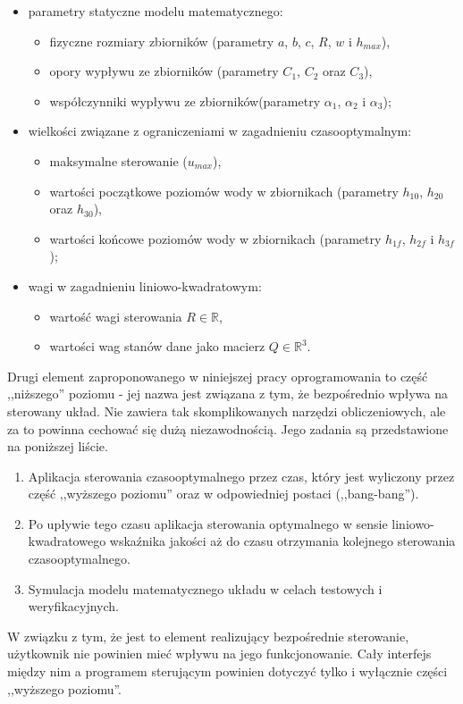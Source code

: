 \begin{itemize}
    \item parametry statyczne modelu matematycznego:
    \begin{itemize}
        \item fizyczne rozmiary zbiorników (parametry $a$, $b$, $c$, $R$, $w$ i $h_{max}$),
        \item opory wypływu ze zbiorników (parametry $C_{1}$, $C_{2}$ oraz $C_{3}$),
        \item współczynniki wypływu ze zbiorników(parametry $\alpha_{1}$, $\alpha_{2}$ i $\alpha_{3}$);
    \end{itemize}
    \item wielkości związane z ograniczeniami w zagadnieniu czasooptymalnym:
    \begin{itemize}
        \item maksymalne sterowanie ($u_{max}$),
        \item wartości początkowe poziomów wody w zbiornikach (parametry $h_{10}$, $h_{20}$ oraz $h_{30}$),
        \item wartości końcowe poziomów wody w zbiornikach (parametry $h_{1f}$, $h_{2f}$ i $h_{3f}$);
    \end{itemize}
    \item wagi w zagadnieniu liniowo-kwadratowym:
    \begin{itemize}
        \item wartość wagi sterowania $R \in \mathbb{R}$,
        \item wartości wag stanów dane jako macierz $Q \in \mathbb{R}^{3}$.
    \end{itemize}
\end{itemize}

Drugi element zaproponowanego w niniejszej pracy oprogramowania to część ,,niższego'' poziomu - jej nazwa jest związana z tym, że bezpośrednio wpływa na sterowany układ. Nie zawiera tak skomplikowanych narzędzi obliczeniowych, ale za to powinna cechować się dużą niezawodnością. Jego zadania są przedstawione na poniższej liście.

\begin{enumerate}
    \item Aplikacja sterowania czasooptymalnego przez czas, który jest wyliczony przez część ,,wyższego poziomu'' oraz w odpowiedniej postaci (,,bang-bang'').
    \item Po upływie tego czasu aplikacja sterowania optymalnego w sensie liniowo-kwadratowego wskaźnika jakości aż do czasu otrzymania kolejnego sterowania czasooptymalnego.
    \item Symulacja modelu matematycznego układu w celach testowych i weryfikacyjnych.
\end{enumerate}

W związku z tym, że jest to element realizujący bezpośrednie sterowanie, użytkownik nie powinien mieć wpływu na jego funkcjonowanie. Cały interfejs między nim a programem sterującym powinien dotyczyć tylko i wyłącznie części ,,wyższego poziomu''.
